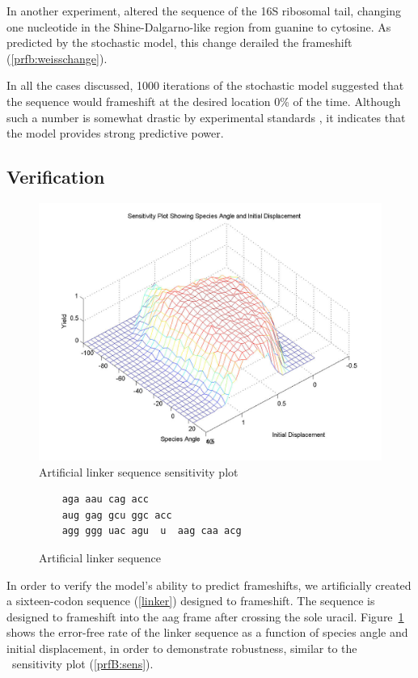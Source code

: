 \documentclass[12pt, draft]{article}
\numberwithin{equation}{section}
\begin{document}
In another experiment, \citeauthor{weiss88} altered the sequence of the
16S ribosomal tail, changing one nucleotide in the Shine-Dalgarno-like region
from guanine to cytosine.  As predicted by the stochastic model, this
change derailed the frameshift (\autoref{prfb:weisschange}).

In all the cases discussed, 1000 iterations of the stochastic model
suggested that the sequence would frameshift at the desired location 0\%
of the time.  Although such a number is somewhat drastic by experimental
standards \cite{weiss87,weiss88}, it indicates that the model provides
strong predictive power.

\subsection{Verification}

\begin{figure}
  \centering
  \caption{Artificial linker sequence sensitivity plot}
  \label{linker:sens}
  \includegraphics[scale=0.25]{linker/sensitivity}
\end{figure}

\begin{figure}
  \caption{Artificial linker sequence}
  \label{linker}
  \begin{verbatim}
    aga aau cag acc
    aug gag gcu ggc acc
    agg ggg uac agu  u  aag caa acg
  \end{verbatim}
\end{figure}

In order to verify the model's ability to predict frameshifts, we
artificially created a sixteen-codon sequence (\autoref{linker})
designed to frameshift.  The sequence is designed to frameshift into
the aag frame after crossing the sole uracil.  Figure~\ref{linker:sens}
shows the error-free rate of the linker sequence as a function of species
angle and initial displacement, in order to demonstrate robustness,
similar to the \prfB\ sensitivity plot (\autoref{prfB:sens}).
\end{document}
